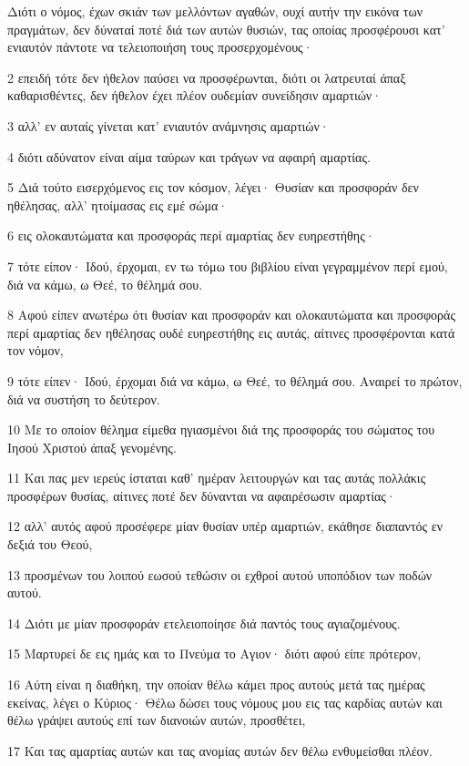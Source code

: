\par Διότι ο νόμος, έχων σκιάν των μελλόντων αγαθών, ουχί αυτήν την εικόνα των πραγμάτων, δεν δύναταί ποτέ διά των αυτών θυσιών, τας οποίας προσφέρουσι κατ' ενιαυτόν πάντοτε να τελειοποιήση τους προσερχομένους·
\par 2 επειδή τότε δεν ήθελον παύσει να προσφέρωνται, διότι οι λατρευταί άπαξ καθαρισθέντες, δεν ήθελον έχει πλέον ουδεμίαν συνείδησιν αμαρτιών·
\par 3 αλλ' εν αυταίς γίνεται κατ' ενιαυτόν ανάμνησις αμαρτιών·
\par 4 διότι αδύνατον είναι αίμα ταύρων και τράγων να αφαιρή αμαρτίας.
\par 5 Διά τούτο εισερχόμενος εις τον κόσμον, λέγει· Θυσίαν και προσφοράν δεν ηθέλησας, αλλ' ητοίμασας εις εμέ σώμα·
\par 6 εις ολοκαυτώματα και προσφοράς περί αμαρτίας δεν ευηρεστήθης·
\par 7 τότε είπον· Ιδού, έρχομαι, εν τω τόμω του βιβλίου είναι γεγραμμένον περί εμού, διά να κάμω, ω Θεέ, το θέλημά σου.
\par 8 Αφού είπεν ανωτέρω ότι θυσίαν και προσφοράν και ολοκαυτώματα και προσφοράς περί αμαρτίας δεν ηθέλησας ουδέ ευηρεστήθης εις αυτάς, αίτινες προσφέρονται κατά τον νόμον,
\par 9 τότε είπεν· Ιδού, έρχομαι διά να κάμω, ω Θεέ, το θέλημά σου. Αναιρεί το πρώτον, διά να συστήση το δεύτερον.
\par 10 Με το οποίον θέλημα είμεθα ηγιασμένοι διά της προσφοράς του σώματος του Ιησού Χριστού άπαξ γενομένης.
\par 11 Και πας μεν ιερεύς ίσταται καθ' ημέραν λειτουργών και τας αυτάς πολλάκις προσφέρων θυσίας, αίτινες ποτέ δεν δύνανται να αφαιρέσωσιν αμαρτίας·
\par 12 αλλ' αυτός αφού προσέφερε μίαν θυσίαν υπέρ αμαρτιών, εκάθησε διαπαντός εν δεξιά του Θεού,
\par 13 προσμένων του λοιπού εωσού τεθώσιν οι εχθροί αυτού υποπόδιον των ποδών αυτού.
\par 14 Διότι με μίαν προσφοράν ετελειοποίησε διά παντός τους αγιαζομένους.
\par 15 Μαρτυρεί δε εις ημάς και το Πνεύμα το Αγιον· διότι αφού είπε πρότερον,
\par 16 Αύτη είναι η διαθήκη, την οποίαν θέλω κάμει προς αυτούς μετά τας ημέρας εκείνας, λέγει ο Κύριος· Θέλω δώσει τους νόμους μου εις τας καρδίας αυτών και θέλω γράψει αυτούς επί των διανοιών αυτών, προσθέτει,
\par 17 Και τας αμαρτίας αυτών και τας ανομίας αυτών δεν θέλω ενθυμείσθαι πλέον.
